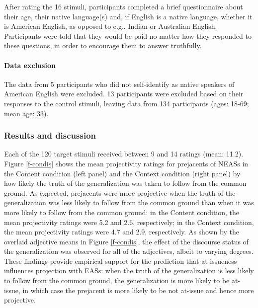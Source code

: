 \documentclass[11pt,fleqn]{article}
\newcommand{\6}{\mbox{$[\hspace*{-.6mm}[$}}
\newcommand{\9}{\mbox{$]\hspace*{-.6mm}]$}}
\begin{document}
After rating the 16 stimuli, participants completed a brief questionnaire about their age, their
native language(s) and, if English is a native language, whether it is
American English, as opposed to e.g., Indian or Australian English.
Participants were told that they would be paid no matter how they
responded to these questions, in order to encourage them to answer
truthfully.


\paragraph{Data exclusion} The data from 5 participants who did not self-identify as native speakers of American English were excluded. 13 participants were excluded based on their responses to the control stimuli, leaving data from 134 participants (ages: 18-69; mean age: 33).

\subsubsection{Results and discussion}

Each of the 120 target stimuli received between 9 and 14 ratings (mean: 11.2). Figure \ref{f-condis} shows the mean projectivity ratings for prejacents of NEASs in the Content condition (left panel) and the Context condition (right panel) by how likely the truth of the generalization was taken to follow from the common ground. As expected, prejacents were more projective when the truth of the generalization was less likely to follow from the common ground than when it was more likely to follow from the common ground: in the Content condition, the mean projectivity ratings were 5.2 and 2.6, respectively; in the Context condition, the mean projectivity ratings were 4.7 and 2.9, respectively. As shown by the overlaid adjective means in Figure \ref{f-condis}, the effect of the discourse status of the generalization was observed for all of the adjectives, albeit to varying degrees. These findings provide empirical support for the prediction that at-issueness influences projection with EASs: when the truth of the generalization is less likely to follow from the common ground, the generalization is more likely to be at-issue, in which case the prejacent is more likely to be not at-issue and hence more projective.
\end{document}
